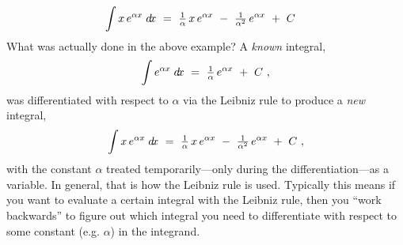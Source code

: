 \begin{center}
\end{center}
\[
\int x\,e^{\alpha x}\;d\!x ~=~
\tfrac{1}{\alpha}\,x\,e^{\alpha x} ~-~ \tfrac{1}{\alpha^2}\,e^{\alpha x} ~+~ C\quad\relax
\]
\newpage
\noindent What was actually done in the above example? A \emph{known} integral,
\[
\int e^{\alpha x}\;d\!x ~=~ \tfrac{1}{\alpha}\,e^{\alpha x} ~+~ C ~,
\]
was differentiated with respect to $\alpha$ via the Leibniz rule to produce a
\emph{new} integral,
\[
\int x\,e^{\alpha x}\;d\!x ~=~
\tfrac{1}{\alpha}\,x\,e^{\alpha x} ~-~ \tfrac{1}{\alpha^2}\,e^{\alpha x} ~+~ C ~,
\]
with the constant $\alpha$ treated temporarily---only during the
differentiation---as a variable. In general, that is how the Leibniz rule is
used. Typically this means if you want to evaluate a certain integral with the
Leibniz rule, then you ``work backwards'' to figure out which integral you need
to differentiate with respect to some constant (e.g. $\alpha$) in the integrand.

